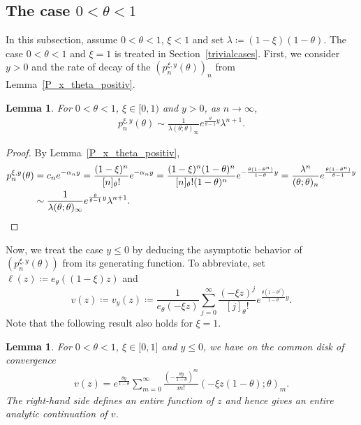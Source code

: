 \documentclass[12pt]{article}
\newcommand{\1}{\mathds{1}}
\theoremstyle{definition}
\theoremstyle{plain}
\newtheorem{Lemma}[definition]{Lemma}
\theoremstyle{remark}
\begin{document}
\subsection{The case \texorpdfstring{$0<\theta<1$}{0<theta<1}}\label{sec_thetale1}
In this subsection, assume $0<\theta<1$, $\xi<1$ and set $\lambda\coloneqq (1-\xi)(1-\theta)$. The case $0<\theta<1$ and $\xi=1$ is treated in Section~\ref{trivialcases}. First, we consider $y>0$ and the rate of decay of the $(p_n^{\xi,y}(\theta))_n$ from Lemma~\ref{P_x_theta_positiv}.
\begin{Lemma}\label{asymptotic_pos_theta_pos_y}
  For $0<\theta<1$, $\xi\in[0,1)$ and $y>0$, as  $n\to\infty$,
    \begin{align*}
        p_n^{\xi,y}(\theta)\sim \frac{1}{\lambda(\theta;\theta)_\infty}e^{\frac{\theta}{\theta-1}y}\lambda^{n+1}.
    \end{align*}
 \end{Lemma}
\begin{proof}
 By Lemma~\ref{P_x_theta_positiv},
    \begin{align*}
        p_n^{\xi,y}(\theta)
        &=c_ne^{-\alpha_ny}
        =\frac{(1-\xi)^n}{[n]_\theta!}e^{-\alpha_ny}=\frac{(1-\xi)^n(1-\theta)^n}{[n]_\theta!(1-\theta)^n}e^{-\frac{\theta(1-\theta^n)}{1-\theta}y}
        =\frac{\lambda^n}{(\theta;\theta)_n}e^{\frac{\theta(1-\theta^n)}{\theta-1}y}
        \\&\sim\frac{1}{\lambda(\theta;\theta)_\infty}e^{\frac{\theta}{\theta-1}y}\lambda^{n+1}.\qedhere
    \end{align*}
\end{proof}
Now, we treat the case $y\le0$ by deducing the asymptotic behavior of $(p_n^{\xi,y}(\theta))$ from its generating function.
To abbreviate, set 
$\ell(z)\coloneqq e_\theta((1-\xi)z)$ and 
$$v(z)\coloneqq v_y(z)\coloneqq  \frac{1}{e_\theta(-\xi z)}\sum_{j=0}^\infty \frac{(-\xi z)^{j}}{[j]_\theta!}e^{\frac{\theta(1-\theta^j)}{1-\theta}y}.$$
Note that the following result also holds for $\xi=1$.
\begin{Lemma}\label{singularities_pos_theta}
   For $0<\theta<1$, $\xi\in\big[0,1]$ and $y\le 0$, we have on the common disk of convergence
   \begin{align}\label{repr_v_thetale1}
    v(z)=e^{\frac{\theta y}{1-\theta}}\sum_{m=0}^\infty\frac{\left(-\frac{\theta y}{1-\theta}\right)^m}{m!}(-\xi z(1-\theta);\theta)_m.
\end{align}
The right-hand side defines an entire function of $z$ and hence gives an entire analytic continuation of $v$.
\end{Lemma}
\end{document}
